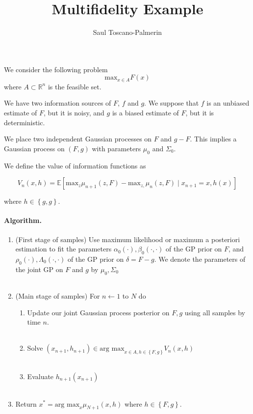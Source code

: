 \documentclass[12pt,english]{article}
\author{Saul Toscano-Palmerin}
\date{}
\begin{document}
\title{Multifidelity Example}

\maketitle
We consider the following problem
\[
\mbox{max}_{x\in A}F\left(x\right)
\]
where $A\subset\mathbb{R}^{n}$ is the feasible set.

We have two information sources of $F$, $f$ and $g$. We suppose that $f$
is an unbiased estimate of $F$, but it is noisy, and $g$ is a biased
estimate of $F$, but it is deterministic.

We place two independent Gaussian processes on $F$ and $g-F$. This implies a Gaussian process
on $(F,g)$ with parameters $\mu_{0}$ and $\Sigma_{0}$.

We define the value of information functions as

\[
V_{n}\left(x,h\right)=\mathbb{E}\left[\mbox{max}_{z}\mu_{n+1}\left(z,F\right)-\mbox{max}_{z,}\mu_{n}\left(z,F\right)\mid x_{n+1}=x,h\left(x\right)\right]
\]

where $h\in\left\{ g,g\right\} $.


\paragraph{Algorithm.}

\begin{enumerate}
\item (First stage of samples) Use maximum likelihood or maximum a posteriori estimation to fit the
parameters $\alpha_{0}\left(\cdot\right),\beta_{0}\left(\cdot,\cdot\right)$
of the GP prior on $F$, and $\rho_{0}\left(\cdot\right),\Lambda_{0}\left(\cdot,\cdot\right)$
of the GP prior on $\delta=F-g$. We denote the parameters of the joint GP on $F$ and $g$ by
$\mu_{0},\Sigma_{0}$\\
 \textrm{}\\
\item (Main stage of samples) For $n\leftarrow1$ to $N$ do
\begin{enumerate}
    \item Update our joint Gaussian process posterior on $F,g$ using all samples by time $n$.\\
    \textrm{}\\
\item Solve $\left(x_{n+1},h_{n+1}\right)\in\mbox{arg max}_{x\in A,h\in\left\{ F,g\right\} }V_{n}\left(x,h\right)$\\
\textrm{}\\
\item Evaluate $h_{n+1}\left(x_{n+1}\right)$\\
\textrm{}\\
\end{enumerate}
\item Return $x^{*}=\mbox{arg max}_{x}\mu_{N+1}\left(x,h\right)$ where $h\in\left\{ F,g\right\}$.
\end{enumerate}
\end{document}
